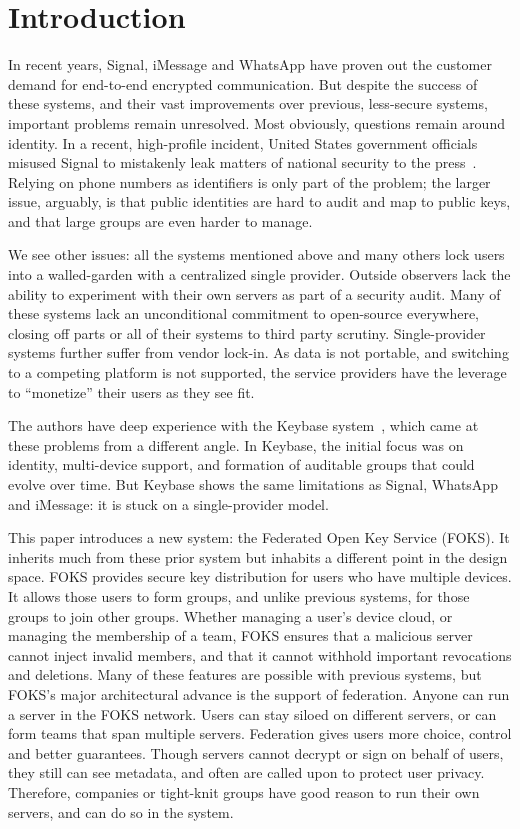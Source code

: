 
\section{Introduction}

In recent years, Signal, iMessage and WhatsApp have proven out the customer
demand for end-to-end encrypted communication. But despite the success of these
systems, and their vast improvements over previous, less-secure systems,
important problems remain unresolved.  Most obviously, questions remain around
identity. In a recent, high-profile incident, United States government officials
misused Signal to mistakenly leak matters of national security to the
press~\cite{signal-hesgeth-leak}. Relying on phone numbers as identifiers is
only part of the problem; the larger issue, arguably, is that public identities
are hard to audit and map to public keys, and that large groups are even harder
to manage.

We see other issues: all the systems mentioned above and many others lock users
into a walled-garden with a centralized single provider. Outside observers lack
the ability to experiment with their own servers as part of a security audit.
Many of these systems lack an unconditional commitment to open-source
everywhere, closing off parts or all of their systems to third party scrutiny. 
Single-provider systems further suffer from vendor lock-in. As data is not
portable, and switching to a competing platform is not supported, the service
providers have the leverage to ``monetize'' their users as they see fit.

The authors have deep experience with the Keybase system~\cite{keybase}, which
came at these problems from a different angle. In Keybase, the initial focus was
on identity, multi-device support, and formation of auditable groups that could
evolve over time. But Keybase shows the same limitations as Signal, WhatsApp and
iMessage: it is stuck on a single-provider model.

This paper introduces a new system: the Federated Open Key Service (FOKS).  It
inherits much from these prior system but inhabits a different point in the
design space. FOKS provides secure key distribution for users who have multiple
devices. It allows those users to form groups, and unlike previous systems, for
those groups to join other groups. Whether managing a user's device cloud, or
managing the membership of a team, FOKS ensures that a malicious server cannot
inject invalid members, and that it cannot withhold important revocations and
deletions.  Many of these features are possible with previous systems, but
FOKS's major architectural advance is the support of federation. Anyone
can run a server in the FOKS network. Users can stay siloed on different
servers, or can form teams that span multiple servers. Federation gives users
more choice, control and better guarantees. Though servers cannot decrypt or
sign on behalf of users, they still can see metadata, and often are called upon
to protect user privacy. Therefore, companies or tight-knit groups have
good reason to run their own servers, and can do so in the system.

